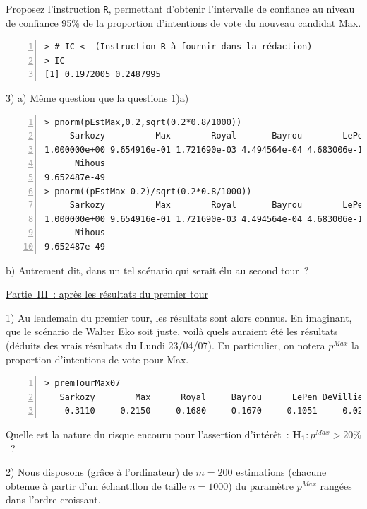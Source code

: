\documentclass[10pt]{report}
\begin{document}
\begin{exercice}
Proposez l'instruction \texttt{R}, permettant d'obtenir l'intervalle de confiance au niveau de confiance 95\% de la proportion d'intentions de vote du nouveau candidat Max.

\begin{Verbatim}[frame=leftline,fontfamily=tt,fontshape=n,numbers=left]
> # IC <- (Instruction R à fournir dans la rédaction)
> IC
[1] 0.1972005 0.2487995
\end{Verbatim}




3) a) 
Même question que la questions 1)a)

\begin{Verbatim}[frame=leftline,fontfamily=tt,fontshape=n,numbers=left]
> pnorm(pEstMax,0.2,sqrt(0.2*0.8/1000)) 
     Sarkozy          Max        Royal       Bayrou        LePen   DeVilliers 
1.000000e+00 9.654916e-01 1.721690e-03 4.494564e-04 4.683006e-15 2.346759e-43 
      Nihous 
9.652487e-49 
> pnorm((pEstMax-0.2)/sqrt(0.2*0.8/1000)) 
     Sarkozy          Max        Royal       Bayrou        LePen   DeVilliers 
1.000000e+00 9.654916e-01 1.721690e-03 4.494564e-04 4.683006e-15 2.346759e-43 
      Nihous 
9.652487e-49
\end{Verbatim}




b) 
Autrement dit, dans un tel scénario qui serait élu au second tour~?



\noindent \underline{Partie~III~: après les résultats du premier tour}

1) 
Au lendemain du premier tour, les résultats sont alors connus. En imaginant, que le scénario de Walter Eko soit juste, voilà quels auraient été les résultats (déduits des vrais résultats du Lundi 23/04/07). En particulier, on notera $p^{Max}$ la proportion d'intentions de vote pour Max.

\begin{Verbatim}[frame=leftline,fontfamily=tt,fontshape=n,numbers=left]
> premTourMax07
   Sarkozy        Max      Royal     Bayrou      LePen DeVilliers     Nihous 
    0.3110     0.2150     0.1680     0.1670     0.1051     0.0224     0.0115
\end{Verbatim}


Quelle est la nature du risque encouru pour l'assertion d'intérêt~: $\mathbf{H_1}: p^{Max}>20\%$~?



2) Nous disposons (grâce à l'ordinateur) de $m=200$ estimations (chacune obtenue à partir d'un échantillon de taille $n=1000$) du paramètre $p^{Max}$ rangées dans l'ordre croissant.


\end{exercice}
\end{document}
